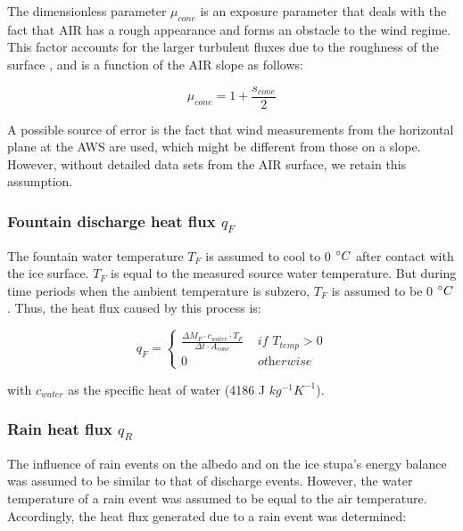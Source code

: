 The dimensionless parameter $\mu_{cone}$ is an exposure parameter that deals with the fact that AIR has a rough
appearance and forms an obstacle to the wind regime. This factor accounts for the larger turbulent fluxes due to
the roughness of the surface \citep{oerlemansBriefCommunicationGrowth2021}, and is a function of the AIR slope
as follows:

\begin{equation}
	\mu_{cone} = 1 + \frac{s_{cone}}{2}
	\label{eqn:mu}
\end{equation}

A possible source of error is the fact that wind measurements from the horizontal plane at the \ac{AWS} are used,
which might be different from those on a slope. However, without detailed data sets from the AIR surface, we
retain this assumption.

\subsubsection{Fountain discharge heat flux \texorpdfstring{$q_{F}$}{Lg} } \label{sec:heatflux}

The fountain water temperature $T_F$ is assumed to cool to 0 $^{\circ} C$ after contact with the ice surface.
$T_F$ is equal to the measured source water temperature. But during time periods when the ambient temperature is
subzero, $T_F$ is assumed to be 0 $^{\circ} C$. Thus, the heat flux caused by this process is:

\begin{equation}
	q_{F} = \left\{ \begin{array}{ll}
		\frac{ \Delta M_F \cdot c_{water} \cdot T_F}{\Delta t \cdot A_{cone}} & \textit{ if } T_{temp} > 0 \\
		0                                                                     & \textit{ otherwise}
	\end{array} \right.
\end{equation}

with $c_{water}$ as the specific heat of water (4186 J $kg^{-1} K^{-1}$).

\subsubsection{Rain heat flux \texorpdfstring{$q_{R}$}{Lg} }

The influence of rain events on the albedo and on the ice stupa's energy balance was assumed to be similar to that of discharge
events. However, the water temperature of a rain event was assumed to be equal to the air temperature. Accordingly,
the heat flux generated due to a rain event was determined:

